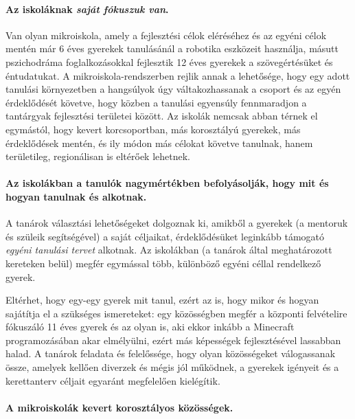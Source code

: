 \paragraph{Az iskoláknak \emph{saját fókuszuk van}.}

    Van olyan mikroiskola, amely a fejlesztési célok eléréséhez és az egyéni célok
    mentén már 6 éves gyerekek tanulásánál a robotika eszközeit használja,
    másutt pszichodráma foglalkozásokkal fejlesztik 12 éves gyerekek a szövegértésüket és
    éntudatukat. A
    mikroiskola-rendszerben rejlik annak a lehetősége, hogy egy adott tanulási
    környezetben a hangsúlyok úgy váltakozhassanak a csoport és az egyén
    érdeklődését követve, hogy közben a tanulási egyensúly fennmaradjon a
    tantárgyak fejlesztési területei között. Az iskolák nemcsak abban térnek el
    egymástól, hogy kevert korcsoportban, más korosztályú gyerekek, más
    érdeklődések mentén, és ily módon más célokat követve tanulnak, hanem
    területileg, regionálisan is eltérőek lehetnek.


  \paragraph{Az iskolákban a tanulók nagymértékben befolyásolják, hogy mit és hogyan tanulnak és alkotnak.}

    A tanárok választási lehetőségeket dolgoznak ki, amikből a gyerekek (a 
    mentoruk és szüleik segítségével) a saját céljaikat, érdeklődésüket leginkább
    támogató \emph{egyéni tanulási tervet} alkotnak. Az iskolákban (a tanárok által
    meghatározott kereteken belül) megfér egymással több, különböző egyéni céllal
    rendelkező gyerek.

    Eltérhet, hogy egy-egy gyerek mit tanul, ezért az is, hogy mikor és hogyan
    sajátítja el a szükséges ismereteket: egy közösségben megfér a központi
    felvételire fókuszáló 11 éves gyerek és az olyan is, aki ekkor inkább a
    Minecraft programozásában akar elmélyülni, ezért más képességek fejlesztésével
    lassabban halad. A tanárok feladata és felelőssége, hogy olyan közösségeket
    válogassanak össze, amelyek kellően diverzek és mégis jól működnek, a gyerekek
    igényeit és a kerettanterv céljait egyaránt megfelelően kielégítik.

  \paragraph{A mikroiskolák kevert korosztályos közösségek.}

